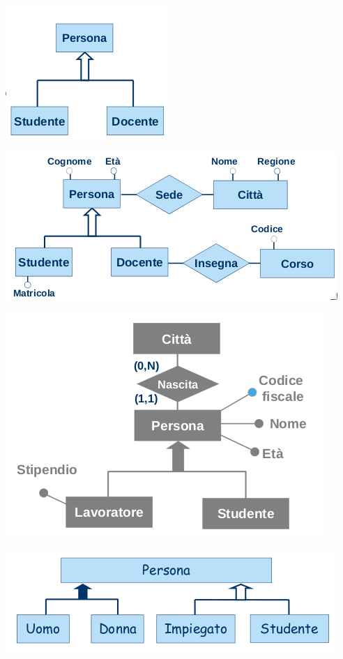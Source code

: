 \documentclass[a4paper,12pt, oneside]{book}
\begin{document}
\begin{center}
	\includegraphics[scale=2.5]{img/isa3.png}
\end{center}
\begin{center}
	\includegraphics[scale=0.5]{img/isa4.png}
\end{center}
\begin{center}
	\includegraphics[scale=0.8]{img/isa5.png}
\end{center}
\begin{center}
	\includegraphics[scale=0.8]{img/isa6.png}
\end{center}
\end{document}
